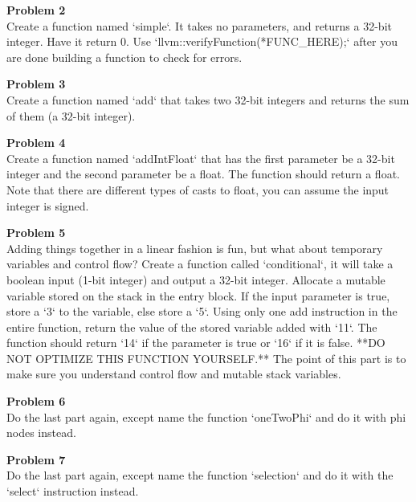 \documentclass[a4paper, 11pt]{article}
\newenvironment{problem}[2][Problem]
    { \begin{mdframed}[backgroundcolor=gray!20] \textbf{#1 #2} \\}
    {  \end{mdframed}}
\begin{document}
\begin{problem}{2}
Create a function named `simple`. It takes no parameters, and returns a 32-bit integer. Have it return 0.
Use `llvm::verifyFunction(*FUNC\_HERE);` after you are done building a function to check for errors.

\end{problem}

\begin{problem}{3}
Create a function named `add` that takes two 32-bit integers and returns the sum of them (a 32-bit integer).

\end{problem}

\begin{problem}{4}
Create a function named `addIntFloat` that has the first parameter be a 32-bit integer and the second parameter be a float. The function should return a float. Note that there are different types of casts to float, you can assume the input integer is signed.

\end{problem}

\begin{problem}{5}
Adding things together in a linear fashion is fun, but what about temporary variables and control flow? Create a function called `conditional`, it will take a boolean input (1-bit integer) and output a 32-bit integer. Allocate a mutable variable stored on the stack in the entry block. If the input parameter is true, store a `3` to the variable, else store a `5`. Using only one add instruction in the entire function, return the value of the stored variable added with `11`. The function should return `14` if the parameter is true or `16` if it is false. **DO NOT OPTIMIZE THIS FUNCTION YOURSELF.** The point of this part is to make sure you understand control flow and mutable stack variables.

\end{problem}

\begin{problem}{6}
Do the last part again, except name the function `oneTwoPhi` and do it with phi nodes instead.

\end{problem}

\begin{problem}{7}
Do the last part again, except name the function `selection` and do it with the `select` instruction instead.

\end{problem}
\end{document}
